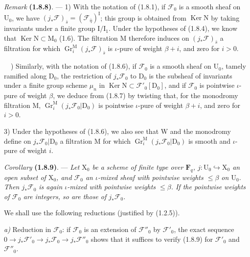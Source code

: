\documentclass[11pt,leqno]{article}
\newcommand{\Page}[1]{\ifvmode\noindent\else\unskip\ \fi{\footnotesize\textcolor{gray}{[p.\,#1]}}\ \ignorespaces}
\begin{document}
\textit{Remark} \textbf{(1.8.8)}. — 1) With the notation of (1.8.1), if \(\mathscr{F}_0\) is a smooth sheaf on \(\mathrm{U}_0\), we have \((j_*\mathscr{F})_{\bar{s}}=(\mathscr{F}_{\bar{\eta}})^{\mathrm{I}}\); this group is obtained from \(\operatorname{Ker}\mathrm{N}\) by taking invariants under a finite group \(\mathrm{I}/\mathrm{I}_1\). Under the hypotheses of (1.8.4), we know that \(\operatorname{Ker}\mathrm{N}\subset\mathrm{M}_0\) (1.6). The filtration \(\mathrm{M}\) therefore induces on \((j_*\mathscr{F})_{\bar{s}}\) a filtration for which \(\operatorname{Gr}_i^{\mathrm{M}}(j_*\mathscr{F})_{\bar{s}}\) is \(\iota\)-pure of weight \(\beta+i\), and zero for \(i>0\).

\Page{177}
2) Similarly, with the notation of (1.8.6), if \(\mathscr{F}_0\) is a smooth sheaf on \(\mathrm{U}_0\), tamely ramified along \(\mathrm{D}_0\), the restriction of \(j_*\mathscr{F}_0\) to \(\mathrm{D}_0\) is the subsheaf of invariants under a finite group scheme \(\mu_n\) in \(\operatorname{Ker}\mathrm{N}\subset\mathscr{F}'_0[\mathrm{D}_0]\), and if \(\mathscr{F}_0\) is pointwise \(\iota\)-pure of weight \(\beta\), we deduce from (1.8.7) by twisting that, for the monodromy filtration \(\mathrm{M}\), \(\operatorname{Gr}_i^{\mathrm{M}}(j_*\mathscr{F}_0\vert\mathrm{D}_0)\) is pointwise \(\iota\)-pure of weight \(\beta+i\), and zero for \(i>0\).

3) Under the hypotheses of (1.8.6), we also see that \(\mathrm{W}\) and the monodromy define on \(j_*\mathscr{F}_0\vert\mathrm{D}_0\) a filtration \(\mathrm{M}\) for which \(\operatorname{Gr}_i^{\mathrm{M}}(j_*\mathscr{F}_0\vert\mathrm{D}_0)\) is smooth and \(\iota\)-pure of weight \(i\).

\textit{Corollary} \textbf{(1.8.9)}. — \textit{Let \(\mathrm{X}_0\) be a scheme of finite type over \(\mathbf{F}_q\), \(j:\mathrm{U}_0\hookrightarrow\mathrm{X}_0\) an open subset of \(\mathrm{X}_0\), and \(\mathscr{F}_0\) an \(\iota\)-mixed sheaf with pointwise weights \(\leq\beta\) on \(\mathrm{U}_0\). Then \(j_*\mathscr{F}_0\) is again \(\iota\)-mixed with pointwise weights \(\leq\beta\). If the pointwise weights of \(\mathscr{F}_0\) are integers, so are those of \(j_*\mathscr{F}_0\).}

We shall use the following reductions (justified by (1.2.5)).

\textit{a)} Reduction in \(\mathscr{F}_0\): if \(\mathscr{F}_0\) is an extension of \(\mathscr{F}''_0\) by \(\mathscr{F}'_0\), the exact sequence \(0\to j_*\mathscr{F}'_0\to j_*\mathscr{F}_0\to j_*\mathscr{F}''_0\) shows that it suffices to verify (1.8.9) for \(\mathscr{F}'_0\) and \(\mathscr{F}''_0\).
\end{document}
